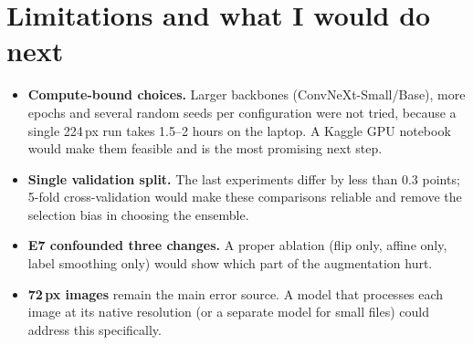 \documentclass[11pt,a4paper]{article}
\begin{document}
\section{Limitations and what I would do next}
\begin{itemize}[leftmargin=*]
\item \textbf{Compute-bound choices.} Larger backbones (ConvNeXt-Small/Base), more epochs and several
random seeds per configuration were not tried, because a single 224\,px run takes 1.5--2 hours on the
laptop. A Kaggle GPU notebook would make them feasible and is the most promising next step.
\item \textbf{Single validation split.} The last experiments differ by less than 0.3 points; 5-fold
cross-validation would make these comparisons reliable and remove the selection bias in choosing the
ensemble.
\item \textbf{E7 confounded three changes.} A proper ablation (flip only, affine only, label smoothing
only) would show which part of the augmentation hurt.
\item \textbf{72\,px images} remain the main error source. A model that processes each image at its
native resolution (or a separate model for small files) could address this specifically.
\end{itemize}

\appendix
\end{document}
